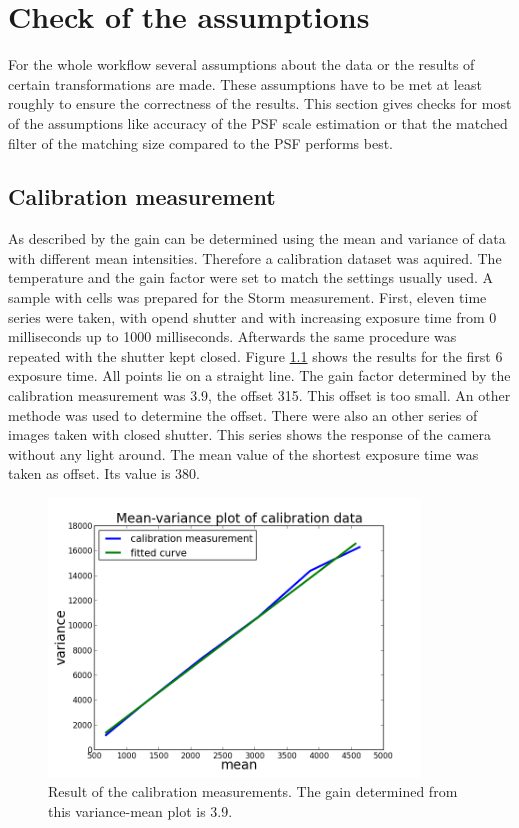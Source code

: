 \chapter{Check of the assumptions}
For the whole workflow several assumptions about the data or the results of certain transformations are made. These assumptions have to be met at least roughly to ensure the correctness of the results.\newline
This section gives checks for most of the assumptions like accuracy of the PSF scale estimation or that the matched filter of the matching size compared to the PSF performs best.
\section{Calibration measurement}
As described by \cite{meanVar} the gain can be determined using the mean and variance of data with different mean intensities. Therefore a calibration dataset was aquired. The temperature and the gain factor were set to match the settings usually used. A sample with cells was prepared for the Storm measurement. First, eleven time series were taken, with opend shutter and with increasing exposure time from 0 milliseconds up to 1000 milliseconds. Afterwards the same procedure was repeated with the shutter kept closed. Figure \ref{calibplot} shows the results for the first 6 exposure time. All points lie on a straight line. The gain factor determined by the calibration measurement was 3.9, the offset 315. This offset is too small. An other methode was used to determine the offset. There were also an other series of  images taken with closed shutter. This series shows the response of the camera without any light around. The mean value of the shortest exposure time was taken as offset. Its value is 380. 
\begin{figure}
\centering
\includegraphics[width = 0.88\textwidth]{pictures/meanVariancePlotCalibration.png}
	 \caption{Result of the calibration measurements. The gain determined from this variance-mean plot is 3.9.}
	\label{calibplot}
\end{figure}


